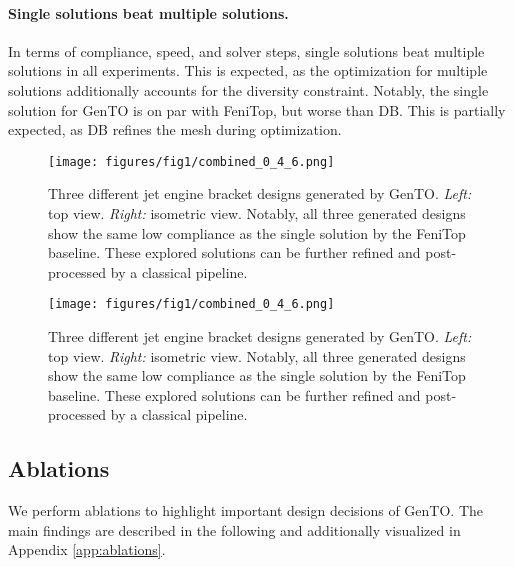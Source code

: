 \paragraph{Single solutions beat multiple solutions.} 
In terms of compliance, speed, and solver steps, single solutions beat multiple solutions in all experiments.
This is expected, as the optimization for multiple solutions additionally accounts for the diversity constraint.
Notably, the single solution for GenTO is on par with FeniTop, but worse than DB.
This is partially expected, as DB refines the mesh during optimization.




    \begin{figure}[h]
        \centering
        \texttt{[image: figures/fig1/combined\_0\_4\_6.png]}
        \caption{
            Three different jet engine bracket designs generated by GenTO. \textit{Left:} top view. \textit{Right:} isometric view. Notably, all three generated designs show the same low compliance as the single solution by the FeniTop baseline. These explored solutions can be further refined and post-processed by a classical pipeline.
        }
        \label{fig:results_simjeb}
    \end{figure}
\else
    \begin{wrapfigure}[21]{r}{0.42\textwidth} %
    \centering
    \vspace{-20pt} %
    \texttt{[image: figures/fig1/combined\_0\_4\_6.png]}
    \caption{
        Three different jet engine bracket designs generated by GenTO. \textit{Left:} top view. \textit{Right:} isometric view. Notably, all three generated designs show the same low compliance as the single solution by the FeniTop baseline. These explored solutions can be further refined and post-processed by a classical pipeline.
    }
    \label{fig:results_simjeb}
    \vspace{-20pt} %
\end{wrapfigure}
\fi









\subsection{Ablations}
\label{ablations}

We perform ablations to highlight important design decisions of GenTO. 
The main findings are described in the following and additionally visualized in Appendix \ref{app:ablations}.


